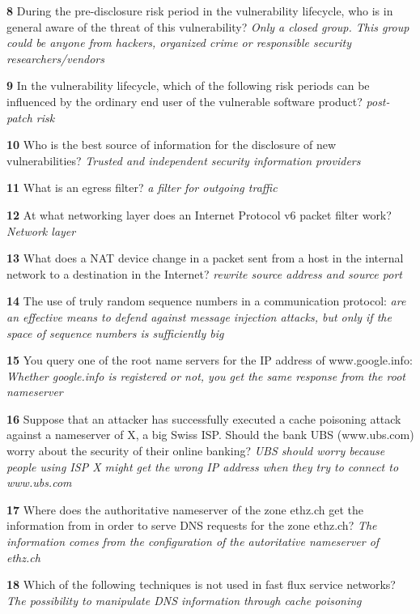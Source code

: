 \textbf{  8}  During the pre-disclosure risk period in the vulnerability lifecycle, who is in general aware of the threat of this vulnerability? 
\textit{ Only a closed group. This group could be anyone from hackers, organized crime or responsible security researchers/vendors}

\textbf{  9}  In the vulnerability lifecycle, which of the following risk periods can be influenced by the ordinary end user of the vulnerable software product? 
\textit{ post-patch risk}

\textbf{  10}  Who is the best source of information for the disclosure of new vulnerabilities?  
\textit{ Trusted and independent security information providers}

\textbf{  11}  What is an egress filter?  
\textit{ a filter for outgoing traffic}

\textbf{  12}  At what networking layer does an Internet Protocol v6 packet filter work?  
\textit{ Network layer}

\textbf{  13}   What does a NAT device change in a packet sent from a host in the internal network to a destination in the Internet? 
\textit{ rewrite source address and source port}

\textbf{  14}  The use of truly random sequence numbers in a communication protocol:  
\textit{ are an effective means to defend against message injection attacks, but only if the space of sequence numbers is sufficiently big}

\textbf{  15}  You query one of the root name servers for the IP address of www.google.info:  
\textit{ Whether google.info is registered or not, you get the same response from the root nameserver}

\textbf{  16}  Suppose that an attacker has successfully executed a cache poisoning attack against a nameserver of X, a big Swiss ISP. Should the bank UBS (www.ubs.com) worry about the security of their online banking? 
\textit{ UBS should worry because people using ISP X might get the wrong IP address when they try to connect to www.ubs.com}

\textbf{  17}  Where does the authoritative nameserver of the zone ethz.ch get the information from in order to serve DNS requests for the zone ethz.ch? 
\textit{ The information comes from the configuration of the autoritative nameserver of ethz.ch}

\textbf{  18}  Which of the following techniques is not used in fast flux service networks?  
\textit{ The possibility to manipulate DNS information through cache poisoning}

